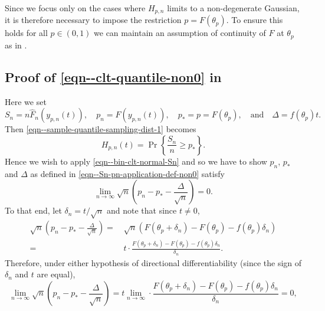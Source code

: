 Since we focus only on the cases where \(H_{p, n}\) limits to a non-degenerate
Gaussian, it is therefore necessary to impose the restriction \(p = F \left(
\theta_{p} \right)\).
To ensure this holds for all \(p \in (0, 1)\) we can maintain an assumption of
continuity of \(F\) at \(\theta_{p}\) as in .

\subsection{Proof of
\texorpdfstring{\eqref{eqn--clt-quantile-non0}}{(\ref{eqn--clt-quantile-non0})}
in \texorpdfstring{}{Theorem \ref{thm--clt-quantile}}}

Here we set
\begin{equation}
  S_{n} = n \widehat{F}_{n} \left( y_{p, n} (t) \right), \quad
  p_{n} = F \left( y_{p, n} (t) \right), \quad p_{\ast} = p = F \left(
  \theta_{p} \right), \quad \text{and} \quad \Delta = f \left( \theta_{p}
  \right) t.
  \label{eqn--Sn-pn-application-def-non0}
\end{equation}
Then \eqref{eqn--sample-quantile-sampling-dist-1} becomes
\begin{equation*}
  H_{p, n} (t) = \Pr \left\{ \frac{S_{n}}{n} \geq p_{\ast} \right\}.
\end{equation*}
Hence we wish to apply \eqref{eqn--bin-clt-normal-Sn} and so we have to show
\(p_{n}\), \(p_{\ast}\) and \(\Delta\) as defined in
\eqref{eqn--Sn-pn-application-def-non0} satisfy
\begin{equation}
  \lim_{n \to \infty} \sqrt{n} \left( p_{n} - p_{\ast} - \frac{\Delta}{\sqrt{n}}
  \right) = 0.
  \label{eqn--bin-clt-normal-Sn-hyp-1}
\end{equation}
To that end, let \(\delta_{n} = t / \sqrt{n}\) and note that since \(t \neq 0\),
\begin{align*}
  \sqrt{n} \left( p_{n} - p_{\ast} - \frac{\Delta}{\sqrt{n}}
  \right) =
  & \, \sqrt{n} \left( F \left( \theta_{p} + \delta_{n} \right) - F \left(
  \theta_{p} \right) - f \left( \theta_{p} \right) \delta_{n} \right) \\
  =
  & \, t \cdot \frac{F \left( \theta_{p} + \delta_{n} \right) - F \left(
  \theta_{p} \right) - f \left( \theta_{p} \right) \delta_{n}}{\delta_{n}}.
\end{align*}
Therefore, under either hypothesis of directional differentiability (since the
sign of \(\delta_{n}\) and \(t\) are equal),
\begin{equation*}
  \lim_{n \to \infty} \sqrt{n} \left( p_{n} - p_{\ast} - \frac{\Delta}{\sqrt{n}}
  \right) = t \lim_{n \to \infty} \cdot \frac{F \left( \theta_{p} + \delta_{n}
\right) - F \left(
  \theta_{p} \right) - f \left( \theta_{p} \right) \delta_{n}}{\delta_{n}} = 0,
\end{equation*}
